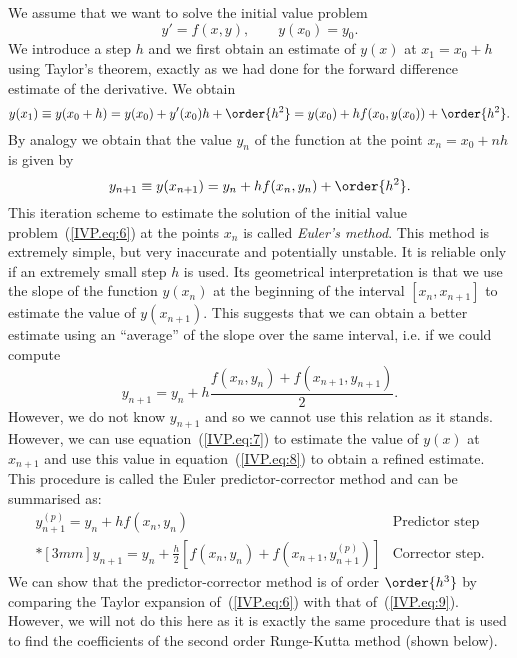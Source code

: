 We assume that we want to solve the initial value problem
%
\begin{equation}
  y' = f(x,y) , \qquad y(x_0) = y_0 .
  \label{IVP.eq:6}
\end{equation}
%
We introduce a step $h$ and we first obtain an estimate of $y(x)$ at
$x_1 = x_0 + h$ using Taylor's theorem, exactly as we had done for the
forward difference estimate of the derivative.  We obtain
%
\begin{equation}
  y(x_1) \equiv y(x_0+h) = y(x_0) + y'(x_0) h + \order{h^2} = 
  y(x_0) + h f(x_0,y(x_0)) + \order{h^2} .
  \label{IVP.eq:7}
\end{equation}
%
By analogy we obtain that the value $y_n$ of the function at the point
$x_n = x_0 + n h$ is given by
%
\begin{equation}
  y_{n+1} \equiv y(x_{n+1}) = y_{n} + h f(x_{n},y_{n}) + \order{h^2} .
  \label{IVP.eq:10}
\end{equation}
%
This iteration scheme to estimate the solution of the initial value
problem~(\ref{IVP.eq:6}) at the points $x_n$ is called \textit{Euler's
  method}.  This method is extremely simple, but very inaccurate and
potentially unstable.  It is reliable only if an extremely small step
$h$ is used.  Its geometrical interpretation is that we use the slope
of the function $y(x_n)$ at the beginning of the interval
$[x_n,x_{n+1}]$ to estimate the value of $y(x_{n+1})$.  This suggests
that we can obtain a better estimate using an ``average'' of the slope
over the same interval, i.e. if we could compute
%
\begin{equation}
  y_{n+1} = y_n + h \frac{f(x_n,y_n) + f(x_{n+1},y_{n+1})}{2} .
  \label{IVP.eq:8}
\end{equation}
%
However, we do not know $y_{n+1}$ and so we cannot use this relation
as it stands.  However, we can use equation~(\ref{IVP.eq:7}) to
estimate the value of $y(x)$ at $x_{n+1}$ and use this value in
equation~(\ref{IVP.eq:8}) to obtain a refined estimate.  This
procedure is called the Euler predictor-corrector method and can be
summarised as:
%
\begin{equation}
  \begin{array}{ll}
    y^{(p)}_{n+1} = y_n + h f(x_n,y_n) & \text{Predictor step} \\*[3mm]
    y_{n+1} = y_n + \displaystyle \frac{h}{2} 
    \left [f(x_n,y_n) + f(x_{n+1},y^{(p)}_{n+1}) \right ] &
    \text{Corrector step}.
  \end{array}
  \label{IVP.eq:9}
\end{equation}
%
We can show that the predictor-corrector method is of order $\order{h^3}$
by comparing the Taylor expansion of~(\ref{IVP.eq:6}) with that
of~(\ref{IVP.eq:9}).  However, we will not do this here as it is
exactly the same procedure that is used to find the coefficients of
the second order Runge-Kutta method (shown below).

